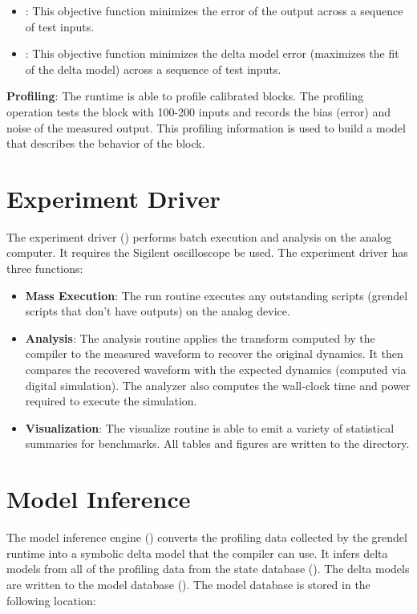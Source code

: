 \begin{itemize}
\item{}: This objective function minimizes the error of the output across a
  sequence of test inputs.
\item{}: This objective function minimizes the delta model error
  (maximizes the fit of the delta model) across a sequence of test inputs. 
\end{itemize}

\noindent\textbf{Profiling}: The \grendel runtime is able to profile calibrated blocks.
The profiling operation tests the block with 100-200 inputs and records the
bias (error) and noise of the measured output. This profiling information is
used to build a model that describes the behavior of the block.

\section{Experiment Driver}

The experiment driver () performs batch execution and analysis
on the analog computer. It requires the Sigilent oscilloscope be used. The
experiment driver has three functions:

\begin{itemize}
\item\textbf{Mass Execution}: The run routine executes any outstanding
 scripts (grendel scripts that don't have outputs) on the analog
device.

\item\textbf{Analysis}: The analysis routine applies the transform computed by the
compiler to the measured waveform to recover the original dynamics. It then
compares the recovered waveform with the expected dynamics (computed via digital
simulation). The analyzer also computes the wall-clock time and power required to
execute the simulation. 

\item\textbf{Visualization}: The visualize routine is able to emit a variety of
statistical summaries for benchmarks. All tables and figures are written to the
 directory. 
\end{itemize}

\section{Model Inference}

The model inference engine () converts the profiling data
collected by the grendel runtime into a symbolic delta model that the \legno compiler
can use. It infers delta models from all of the profiling data from the state database
(). The delta models are written to the model database
(). The model database is stored in the following location:


